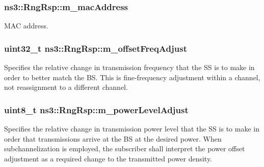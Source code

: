 \subsubsection[{\texorpdfstring{m\+\_\+mac\+Address}{m_macAddress}}]{ ns3\+::\+Rng\+Rsp\+::m\+\_\+mac\+Address\hspace{0.3cm}{\ttfamily [private]}}\hypertarget{classns3_1_1RngRsp_a0928510e078fa288dd8b0c6a8e728e74}{}\label{classns3_1_1RngRsp_a0928510e078fa288dd8b0c6a8e728e74}


M\+AC address. 

\subsubsection[{\texorpdfstring{m\+\_\+offset\+Freq\+Adjust}{m_offsetFreqAdjust}}]{\setlength{\rightskip}{0pt plus 5cm}uint32\+\_\+t ns3\+::\+Rng\+Rsp\+::m\+\_\+offset\+Freq\+Adjust\hspace{0.3cm}{\ttfamily [private]}}\hypertarget{classns3_1_1RngRsp_ac84bb59d1be77321bb81cf7bf29ca11d}{}\label{classns3_1_1RngRsp_ac84bb59d1be77321bb81cf7bf29ca11d}
Specifies the relative change in transmission frequency that the SS is to make in order to better match the BS. This is fine-\/frequency adjustment within a channel, not reassignment to a different channel. 
\subsubsection[{\texorpdfstring{m\+\_\+power\+Level\+Adjust}{m_powerLevelAdjust}}]{\setlength{\rightskip}{0pt plus 5cm}uint8\+\_\+t ns3\+::\+Rng\+Rsp\+::m\+\_\+power\+Level\+Adjust\hspace{0.3cm}{\ttfamily [private]}}\hypertarget{classns3_1_1RngRsp_a901da94288993e4e4f0cd897e65fb91a}{}\label{classns3_1_1RngRsp_a901da94288993e4e4f0cd897e65fb91a}
Specifies the relative change in transmission power level that the SS is to make in order that transmissions arrive at the BS at the desired power. When subchannelization is employed, the subscriber shall interpret the power offset adjustment as a required change to the transmitted power density. 
